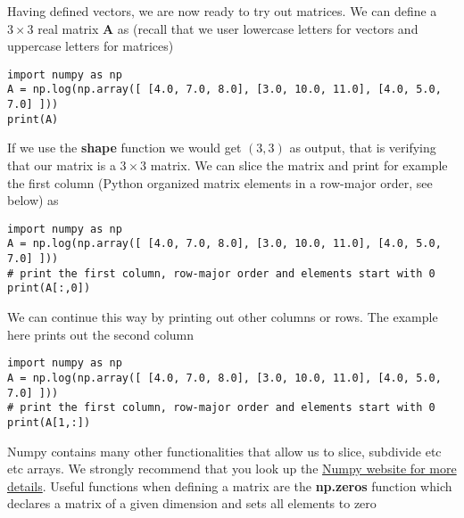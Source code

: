 \documentclass[%
oneside,                 %
final,                   %
10pt]{article}
\begin{document}
Having defined vectors, we are now ready to try out matrices. We can
define a $3 \times 3 $ real matrix $\bm{A}$ as (recall that we user
lowercase letters for vectors and uppercase letters for matrices)





\begin{verbatim}
import numpy as np
A = np.log(np.array([ [4.0, 7.0, 8.0], [3.0, 10.0, 11.0], [4.0, 5.0, 7.0] ]))
print(A)

\end{verbatim}

If we use the \textbf{shape} function we would get $(3, 3)$ as output, that is verifying that our matrix is a $3\times 3$ matrix. We can slice the matrix and print for example the first column (Python organized matrix elements in a row-major order, see below) as





\begin{verbatim}
import numpy as np
A = np.log(np.array([ [4.0, 7.0, 8.0], [3.0, 10.0, 11.0], [4.0, 5.0, 7.0] ]))
# print the first column, row-major order and elements start with 0
print(A[:,0]) 

\end{verbatim}

We can continue this way by printing out other columns or rows. The example here prints out the second column





\begin{verbatim}
import numpy as np
A = np.log(np.array([ [4.0, 7.0, 8.0], [3.0, 10.0, 11.0], [4.0, 5.0, 7.0] ]))
# print the first column, row-major order and elements start with 0
print(A[1,:]) 

\end{verbatim}

Numpy contains many other functionalities that allow us to slice, subdivide etc etc arrays. We strongly recommend that you look up the \href{{http://www.numpy.org/}}{Numpy website for more details}. Useful functions when defining a matrix are the \textbf{np.zeros} function which declares a matrix of a given dimension and sets all elements to zero
\end{document}
